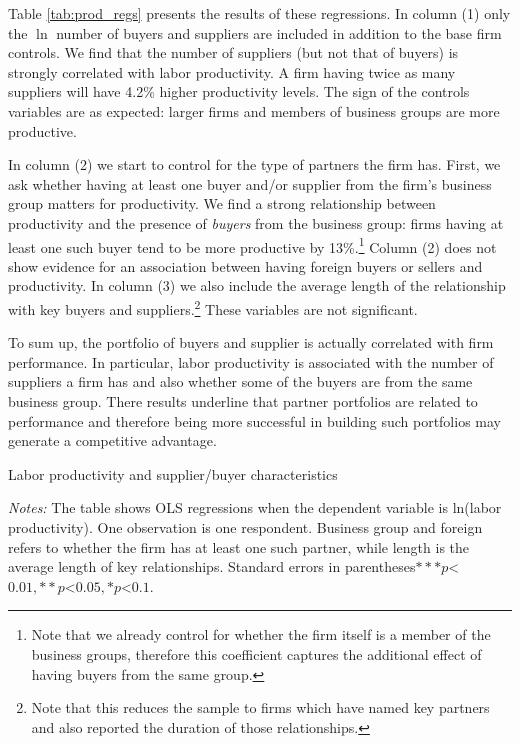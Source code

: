\documentclass[final, dvipsnames, authoryear,12pt]{elsarticle}
\begin{document}

Table \ref{tab:prod_regs} presents the results of these regressions. In column (1) only the $\ln$ number of buyers and suppliers are included in addition to the base firm controls. We find that the number of suppliers (but not that of buyers) is strongly correlated with labor productivity. A firm having twice as many suppliers will have 4.2\% higher productivity levels. The sign of the controls variables are as expected: larger firms and members of business groups are more productive.

In column (2) we start to control for the type of partners the firm has. First, we ask whether having at least one buyer and/or supplier from the firm's business group matters for productivity. We find a strong relationship between productivity and the presence of \textit{buyers} from the business group: firms having at least one such buyer tend to be more productive by 13\%.\footnote{Note that we already control for whether the firm itself is a member of the business groups, therefore this coefficient captures the additional effect of having buyers from the same group.} Column (2) does not show evidence for an association between having foreign buyers or sellers and productivity. In column (3) we also include the average length of the relationship with key buyers and suppliers.\footnote{Note that this reduces the sample to firms which have named key partners and also reported the duration of those relationships.} These variables are not significant.

To sum up, the portfolio of buyers and supplier is actually correlated with firm performance. In particular, labor productivity is associated with the number of suppliers a firm has and also whether some of the buyers are from the same business group. There results underline that partner portfolios are related to performance and therefore being more successful in building such portfolios may generate a competitive advantage.


\begin{table}[H]
    \caption{Labor productivity and supplier/buyer characteristics}
    \label{tab:prod_regs}
    \centerline{}

    {\scriptsize \textit{Notes:} The table shows OLS regressions when the dependent variable is ln(labor productivity). One observation is one respondent. Business group and foreign refers to whether the firm has at least one such partner, while length is the average length of key relationships. Standard errors in parentheses$ *** p$<$0.01, ** p$<$0.05, * p$<$0.1 $.}
\end{table}
    
\end{document}
